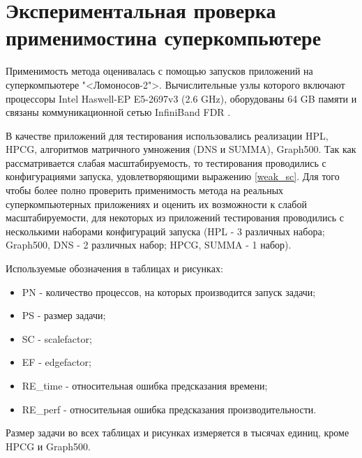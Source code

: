 \section{Экспериментальная проверка применимости на суперкомпьютере}
	Применимость метода оценивалась с помощью запусков приложений на суперкомпьютере "<Ломоносов-2">. Вычислительные узлы которого включают процессоры Intel Haswell-EP E5-2697v3 (2.6 GHz), оборудованы 64 GB памяти и связаны коммуникационной сетью InfiniBand FDR \cite{Lom2_stat}.

	В качестве приложений для тестирования использовались реализации HPL, HPCG, алгоритмов матричного умножения (DNS и SUMMA), Graph500. Так как рассматривается слабая масштабируемость, то тестирования проводились с конфигурациями запуска, удовлетворяющими выражению \eqref{weak_sc}. Для того чтобы более полно проверить применимость метода на реальных суперкомпьютерных приложениях и оценить их возможности к слабой масштабируемости, для некоторых из приложений тестирования проводились с несколькими наборами конфигураций запуска (HPL - 3 различных набора; Graph500, DNS - 2 различных набор; HPCG, SUMMA - 1 набор).

	Используемые обозначения в таблицах и рисунках:
	\begin{itemize}
		\item PN - количество процессов, на которых производится запуск задачи;
		\item PS - размер задачи;
		\item SC - scalefactor;
		\item EF - edgefactor;
		\item RE\_time - относительная ошибка предсказания времени;
		\item RE\_perf - относительная ошибка предсказания производительности.
	\end{itemize}
	Размер задачи во всех таблицах и рисунках измеряется в тысячах единиц, кроме HPCG и Graph500.

